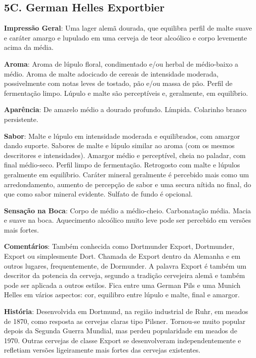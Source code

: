 \subsection*{5C. German Helles Exportbier}
\textbf{Impressão Geral}: Uma lager alemã dourada, que equilibra perfil de malte suave e caráter amargo e lupulado em uma cerveja de teor alcoólico e corpo levemente acima da média.

\textbf{Aroma}: Aroma de lúpulo floral, condimentado e/ou herbal de médio-baixo a médio. Aroma de malte adocicado de cereais de intensidade moderada, possivelmente com notas leves de tostado, pão e/ou massa de pão. Perfil de fermentação limpo. Lúpulo e malte são perceptíveis e, geralmente, em equilíbrio.

\textbf{Aparência}: De amarelo médio a dourado profundo. Límpida. Colarinho branco persistente.

\textbf{Sabor}: Malte e lúpulo em intensidade moderada e equilibrados, com amargor dando suporte. Sabores de malte e lúpulo similar ao aroma (com os mesmos descritores e intensidades). Amargor médio e perceptível, cheia no paladar, com final médio-seco. Perfil limpo de fermentação. Retrogosto com malte e lúpulos geralmente em equilíbrio. Caráter mineral geralmente é percebido mais como um arredondamento, aumento de percepção de sabor e uma secura nítida no final, do que como sabor mineral evidente. Sulfato de fundo é opcional.

\textbf{Sensação na Boca}: Corpo de médio a médio-cheio. Carbonatação média. Macia e suave na boca. Aquecimento alcoólico muito leve pode ser percebido em versões mais fortes.

\textbf{Comentários}: Também conhecida como Dortmunder Export, Dortmunder, Export ou simplesmente Dort. Chamada de Export dentro da Alemanha e em outros lugares, frequentemente, de Dormunder. A palavra Export é também um descritor da potencia da cerveja, segundo a tradição cervejeira alemã e também pode ser aplicada a outros estilos. Fica entre uma German Pils e uma Munich Helles em vários aspectos: cor, equilibro entre lúpulo e malte, final e amargor.

\textbf{História}: Desenvolvida em Dortmund, na região industrial de Ruhr, em meados de 1870, como resposta as cervejas claras tipo Pilsner. Tornou-se muito popular depois da Segunda Guerra Mundial, mas perdeu popularidade em meados de 1970. Outras cervejas de classe Export se desenvolveram independentemente e refletiam versões ligeiramente mais fortes das cervejas existentes.

